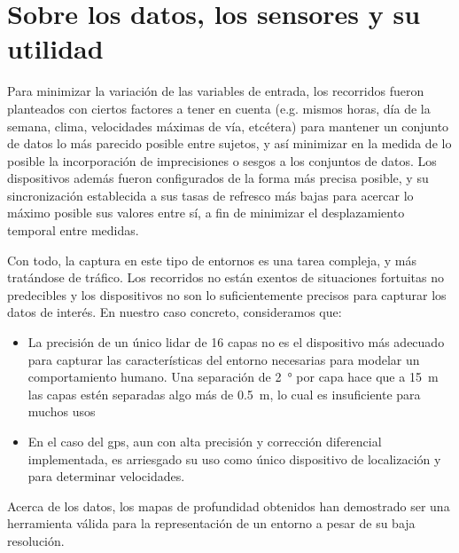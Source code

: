 \section{Sobre los datos, los sensores y su utilidad}

Para minimizar la variación de las variables de entrada, los recorridos fueron planteados con ciertos factores a tener en cuenta (e.g. mismos horas, día de la semana, clima, velocidades máximas de vía, etcétera) para mantener un conjunto de datos lo más parecido posible entre sujetos, y así minimizar en la medida de lo posible la incorporación de imprecisiones o sesgos a los conjuntos de datos. Los dispositivos además fueron configurados de la forma más precisa posible, y su sincronización establecida a sus tasas de refresco más bajas para acercar lo máximo posible sus valores entre sí, a fin de minimizar el desplazamiento temporal entre medidas.

Con todo, la captura en este tipo de entornos es una tarea compleja, y más tratándose de tráfico. Los recorridos no están exentos de situaciones fortuitas no predecibles y los dispositivos no son lo suficientemente precisos para capturar los datos de interés. En nuestro caso concreto, consideramos que:

\begin{itemize}
	\item La precisión de un único \acrshort{lidar} de 16 capas no es el dispositivo más adecuado para capturar las características del entorno necesarias para modelar un comportamiento humano. Una separación de \SI{2}{\degree} por capa hace que a \SI{15}{\meter} las capas estén separadas algo más de \SI{0.5}{\meter}, lo cual es insuficiente para muchos usos
	\item En el caso del \Acrshort{gps}, aun con alta precisión y corrección diferencial implementada, es arriesgado su uso como único dispositivo de localización y para determinar velocidades.
\end{itemize}

Acerca de los datos, los mapas de profundidad obtenidos han demostrado ser una herramienta válida para la representación de un entorno a pesar de su baja resolución.

